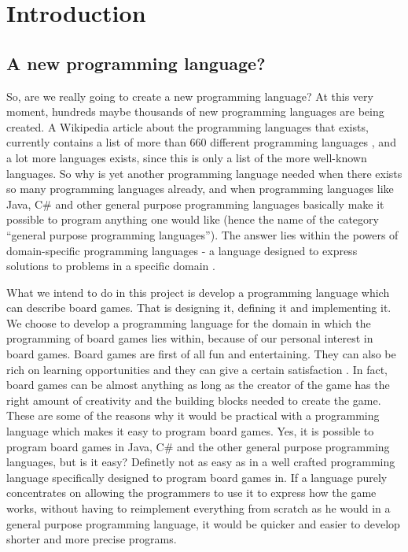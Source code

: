 \chapter{Introduction}
\label{chap:introduction}

\section{A new programming language?}
So, are we really going to create a new programming language? At this very moment, hundreds maybe thousands of new programming languages are being created. A Wikipedia article about the programming languages that exists, currently contains a list of more than 660 different programming languages \cite{listofprogramminglanguages}, and a lot more languages exists, since this is only a list of the more well-known languages. So why is yet another programming language needed when there exists so many programming languages already, and when programming languages like Java, C\# and other general purpose programming languages basically make it possible to program anything one would like (hence the name of the category ``general purpose programming languages''). The answer lies within the powers of domain-specific programming languages - a language designed to express solutions to problems in a specific domain \cite{domainspecificprogramminglanguagedefinition}. 

What we intend to do in this project is develop a programming language which can describe board games. That is designing it, defining it and implementing it. We choose to develop a programming language for the domain in which the programming of board games lies within, because of our personal interest in board games. Board games are first of all fun and entertaining. They can also be rich on learning opportunities \cite{whyboardgames1?} and they can give a certain satisfaction \cite{whyboardgames2?}. In fact, board games can be almost anything as long as the creator of the game has the right amount of creativity and the building blocks needed to create the game. These are some of the reasons why it would be practical with a programming language which makes it easy to program board games. Yes, it is possible to program board games in Java, C\# and the other general purpose programming languages, but is it easy? Definetly not as easy as in a well crafted programming language specifically designed to program board games in. If a language purely concentrates on allowing the programmers to use it to express how the game works, without having to reimplement everything from scratch as he would in a general purpose programming language, it would be quicker and easier to develop shorter and more precise programs.  

